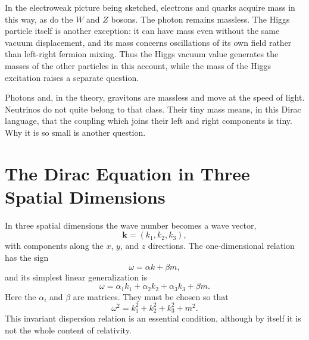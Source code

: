 In the electroweak picture being sketched, electrons and quarks acquire mass in this way, as do the \(W\) and \(Z\) bosons. The photon remains massless. The Higgs particle itself is another exception: it can have mass even without the same vacuum displacement, and its mass concerns oscillations of its own field rather than left-right fermion mixing. Thus the Higgs vacuum value generates the masses of the other particles in this account, while the mass of the Higgs excitation raises a separate question.

\begin{classroomqa}
\end{classroomqa}

Photons and, in the theory, gravitons are massless and move at the speed of light. Neutrinos do not quite belong to that class. Their tiny mass means, in this Dirac language, that the coupling which joins their left and right components is tiny. Why it is so small is another question.

\section{The Dirac Equation in Three Spatial Dimensions}

In three spatial dimensions the wave number becomes a wave vector,
\begin{equation}
\mathbf{k}=(k_1,k_2,k_3),
\end{equation}
with components along the \(x\), \(y\), and \(z\) directions. The one-dimensional relation has the sign
\begin{equation}
\omega=\alpha k+\beta m,
\end{equation}
and its simplest linear generalization is
\begin{equation}
\omega
=
\alpha_1 k_1+\alpha_2 k_2+\alpha_3 k_3+\beta m.
\end{equation}
Here the \(\alpha_i\) and \(\beta\) are matrices. They must be chosen so that
\begin{equation}
\omega^2=k_1^2+k_2^2+k_3^2+m^2.
\end{equation}
This invariant dispersion relation is an essential condition, although by itself it is not the whole content of relativity.

